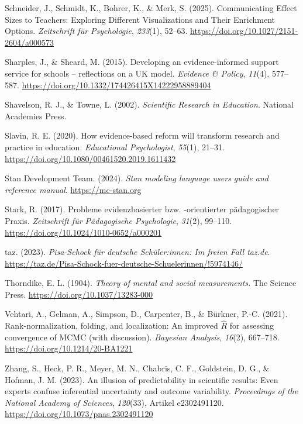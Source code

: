 \documentclass[
  man,
  floatsintext,
  longtable,
  nolmodern,
  notxfonts,
  notimes,
  colorlinks=true,linkcolor=blue,citecolor=blue,urlcolor=blue]{apa7}
\newlength{\cslhangindent}
\newenvironment{CSLReferences}[2] %
 {\begin{list}{}{%
  \setlength{\itemindent}{0pt}
  \setlength{\leftmargin}{0pt}
  \setlength{\parsep}{0pt}
  \ifodd #1
   \setlength{\leftmargin}{\cslhangindent}
   \setlength{\itemindent}{-1\cslhangindent}
  \fi
  \setlength{\itemsep}{#2\baselineskip}}}
 {\end{list}}
\begin{document}
\begin{CSLReferences}{1}{0}
Schneider, J., Schmidt, K., Bohrer, K., \& Merk, S. (2025).
Communicating {Effect} {Sizes} to {Teachers}: {Exploring} {Different}
{Visualizations} and {Their} {Enrichment} {Options}. \emph{Zeitschrift
für Psychologie}, \emph{233}(1), 52--63.
\url{https://doi.org/10.1027/2151-2604/a000573}

Sharples, J., \& Sheard, M. (2015). Developing an evidence-informed
support service for schools -- reflections on a {UK} model.
\emph{Evidence \& Policy}, \emph{11}(4), 577--587.
\url{https://doi.org/10.1332/174426415X14222958889404}

Shavelson, R. J., \& Towne, L. (2002). \emph{Scientific Research in
Education}. National Academies Press.

Slavin, R. E. (2020). How evidence-based reform will transform research
and practice in education. \emph{Educational Psychologist},
\emph{55}(1), 21--31.
\url{https://doi.org/10.1080/00461520.2019.1611432}

Stan Development Team. (2024). \emph{Stan modeling language users guide
and reference manual}. \url{https://mc-stan.org}

Stark, R. (2017). Probleme evidenzbasierter bzw. -orientierter
pädagogischer Praxis. \emph{Zeitschrift für Pädagogische Psychologie},
\emph{31}(2), 99--110. \url{https://doi.org/10.1024/1010-0652/a000201}

taz. (2023). \emph{Pisa-Schock für deutsche Schü­le­r:in­nen: Im freien
Fall \textbar{} taz.de}.
\url{https://taz.de/Pisa-Schock-fuer-deutsche-Schuelerinnen/!5974146/}

Thorndike, E. L. (1904). \emph{Theory of mental and social
measurements.} The Science Press.
\url{https://doi.org/10.1037/13283-000}

Vehtari, A., Gelman, A., Simpson, D., Carpenter, B., \& Bürkner, P.-C.
(2021). Rank-normalization, folding, and localization: An improved
\(\widehat{R}\) for assessing convergence of MCMC (with discussion).
\emph{Bayesian Analysis}, \emph{16}(2), 667--718.
\url{https://doi.org/10.1214/20-BA1221}

Zhang, S., Heck, P. R., Meyer, M. N., Chabris, C. F., Goldstein, D. G.,
\& Hofman, J. M. (2023). An illusion of predictability in scientific
results: Even experts confuse inferential uncertainty and outcome
variability. \emph{Proceedings of the National Academy of Sciences},
\emph{120}(33), Artikel e2302491120.
\url{https://doi.org/10.1073/pnas.2302491120}

\end{CSLReferences}
\end{document}
